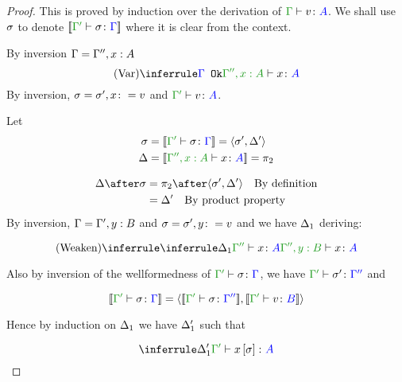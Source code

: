\documentclass{report}
\begin{document}
\begin{framed}
    \begin{proof}
        This is proved by induction over the derivation of $\typerelation{\G}{v}{A}$.
        We shall use $\sigma$ to denote $\deno{\typerelation{\G'}{\si}{\G}}$ where it is clear from the context.
        
        By inversion $\Gamma = \Gamma'', x:A$
        \begin{equation}
            \ntreeruleI{Var}{\ok{\G}}{\typerelation{\G'', x:A}{x}{A}}
        \end{equation}
        By inversion, $\sigma = \sigma', x\colon= v$ and $\typerelation{\G'}{v}{A}$.
        
        Let 
        \begin{align*}
            \si &=\deno{\typerelation{\G'}{\si}{\G}} = \pr{\si'}{\D'}\\
            \D &=\deno{\typerelation{\G'', x:A}{x}{A}} = \pp\\
        \end{align*}
        
        \begin{align*}
            \D\after\si &= \pp\after\pr{\si'}{\D'}\qt{By definition}\\
            &= \D'\qt{By product property}
        \end{align*}
        By inversion, $\Gamma = \Gamma', y:B$ and $\sigma = \sigma', y\colon= v$
        and we have $\Delta_1$ deriving:
        
        \begin{equation}
            \ntreeruleI{Weaken}{\treeruleI{\D_1}{\typerelation{\G''}{x}{A}}}{\typerelation{\G'',y: B}{x}{A}}
        \end{equation}
        
        Also by inversion of the wellformedness of $\typerelation{\G'}{\si}{\G}$, we have $\typerelation{\G'}{\si'}{\G''}$ and 
        
        \begin{equation}
            \deno{\typerelation{\G'}{\si}{\G}} = \pr{\deno{\typerelation{\G'}{\si}{\G''}}}{\deno{\typerelation{\G'}{v}{B}}}
        \end{equation}
        
        Hence by induction on $\Delta_1$ we have $\Delta_1'$ such that
        
        \begin{equation}
            \treeruleI{\D_1'}{\typerelation{\G'}{x\ssi}{A}}
        \end{equation}
        

\end{proof}
\end{framed}
\end{document}
